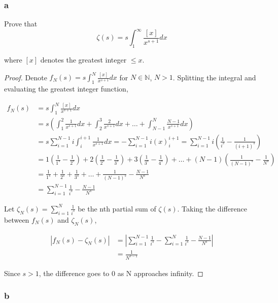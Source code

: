 \documentclass{amsart}
\begin{document}
\subsubsection*{a}

Prove that
\[
\zeta(s) = s\int_1^\infty \frac{[x]}{x^{s+1}}dx
\]

where $[x]$ denotes the greatest integer $\leq x$.

\begin{proof}
Denote $f_N(s) = s\int_1^N \frac{[x]}{x^{s+1}}dx$ for $N \in \mathbb{N}$, $N > 1$. Splitting the integral and evaluating the greatest integer function,

\begin{align*}
f_N(s) &= s\int_1^N \frac{[x]}{x^{s+1}}dx \\
&= s\left(
\int_1^2 \frac{1}{x^{s+1}}dx + \int_2^3 \frac{2}{x^{s+1}}dx + \dots + \int_{N-1}^N \frac{N-1}{x^{s+1}}dx
\right) \\
&= s \sum_{i=1}^{N-1} i \int_i^{i+1}\frac{1}{x^{s+1}} dx
= -\sum_{i=1}^{N-1} i (x)_i^{i+1} = \sum_{i=1}^{N-1} i\left(\frac{1}{i^s} - \frac{1}{(i+1)^s} \right) \\
&= 1\left(\frac{1}{1^s} - \frac{1}{2^s}\right) 
+ 2\left(\frac{1}{2^s} - \frac{1}{3^s}\right)
+ 3\left(\frac{1}{3^s} - \frac{1}{4^s}\right)
+ \dots + (N-1)\left( \frac{1}{(N-1)^s} - \frac{1}{N^s} \right) \\
&= \frac{1}{1^s} + \frac{1}{2^s} + \frac{1}{3^s} + \dots + \frac{1}{(N-1)^s} - \frac{N-1}{N^s} \\
&= \sum_{i=1}^{N-1} \frac{1}{i^s} - \frac{N-1}{N^s}
\end{align*}

Let $\zeta_N(s) = \sum_{i=1}^N \frac{1}{i^s}$ be the nth partial sum of $\zeta(s)$. Taking the difference between $f_N(s)$ and $\zeta_N(s)$,

\begin{align*}
|f_N(s) - \zeta_N(s)| &= \left| \sum_{i=1}^{N-1} \frac{1}{i^s} - \sum_{i=1}^N \frac{1}{i^s} - \frac{N-1}{N^s} \right| \\
&= \frac{1}{N^{s-1}}
\end{align*}

Since $s > 1$, the difference goes to 0 as N approaches infinity.

\end{proof}

\subsubsection*{b}
\end{document}
